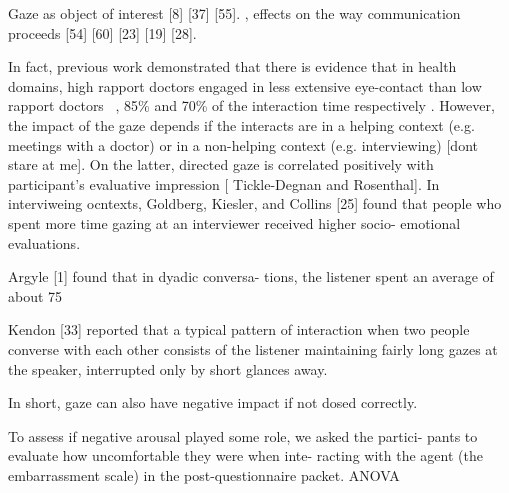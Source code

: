 Gaze as object of interest [8] [37] [55]. , effects on the way communication proceeds [54] [60] [23] [19] [28].





In fact, previous work demonstrated that there is evidence that in health domains, high rapport doctors engaged in less extensive eye-contact than low rapport doctors  , 85\% and 70\% of the interaction time respectively . However, the impact of the gaze depends if the interacts are in a helping context (e.g. meetings with a doctor) or in a non-helping context (e.g. interviewing)  [dont stare at me].  On the latter, directed gaze is correlated positively with participant’s evaluative impression [ Tickle-Degnan and Rosenthal]. In interviweing ocntexts, Goldberg, Kiesler, and Collins [25] found that people who spent more time gazing at an interviewer received higher socio- emotional evaluations. 

Argyle [1] found that in dyadic conversa- tions, the listener spent an average of about 75%

Kendon [33] reported that a typical pattern of interaction when two people converse with each other consists of the listener maintaining fairly long gazes at the speaker, interrupted only by short glances away.

In short, gaze can also have negative impact if not dosed correctly.


To assess if negative arousal played some role, we asked the partici- pants to evaluate how uncomfortable they were when inte- racting with the agent (the embarrassment scale) in the post-questionnaire packet. ANOVA

